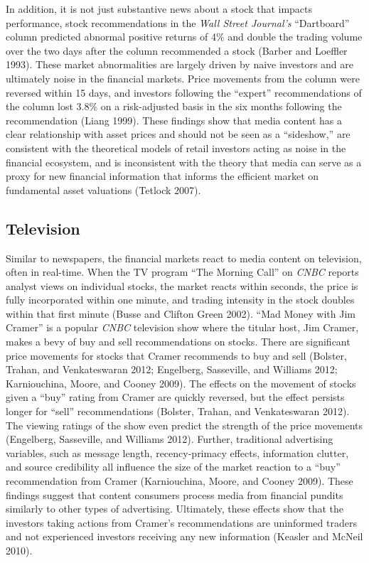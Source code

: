 \documentclass[12pt,]{article}
\begin{document}
In addition, it is not just substantive news about a stock that impacts
performance, stock recommendations in the \emph{Wall Street Journal's}
``Dartboard'' column predicted abnormal positive returns of 4\% and
double the trading volume over the two days after the column recommended
a stock (Barber and Loeffler 1993). These market abnormalities are
largely driven by naive investors and are ultimately noise in the
financial markets. Price movements from the column were reversed within
15 days, and investors following the ``expert'' recommendations of the
column lost 3.8\% on a risk-adjusted basis in the six months following
the recommendation (Liang 1999). These findings show that media content
has a clear relationship with asset prices and should not be seen as a
``sideshow,'' are consistent with the theoretical models of retail
investors acting as noise in the financial ecosystem, and is
inconsistent with the theory that media can serve as a proxy for new
financial information that informs the efficient market on fundamental
asset valuations (Tetlock 2007).

\hypertarget{television}{%
\subsection{Television}\label{television}}

Similar to newspapers, the financial markets react to media content on
television, often in real-time. When the TV program ``The Morning Call''
on \emph{CNBC} reports analyst views on individual stocks, the market
reacts within seconds, the price is fully incorporated within one
minute, and trading intensity in the stock doubles within that first
minute (Busse and Clifton Green 2002). ``Mad Money with Jim Cramer'' is
a popular \emph{CNBC} television show where the titular host, Jim
Cramer, makes a bevy of buy and sell recommendations on stocks. There
are significant price movements for stocks that Cramer recommends to buy
and sell (Bolster, Trahan, and Venkateswaran 2012; Engelberg,
Sasseville, and Williams 2012; Karniouchina, Moore, and Cooney 2009).
The effects on the movement of stocks given a ``buy'' rating from Cramer
are quickly reversed, but the effect persists longer for ``sell''
recommendations (Bolster, Trahan, and Venkateswaran 2012). The viewing
ratings of the show even predict the strength of the price movements
(Engelberg, Sasseville, and Williams 2012). Further, traditional
advertising variables, such as message length, recency-primacy effects,
information clutter, and source credibility all influence the size of
the market reaction to a ``buy'' recommendation from Cramer
(Karniouchina, Moore, and Cooney 2009). These findings suggest that
content consumers process media from financial pundits similarly to
other types of advertising. Ultimately, these effects show that the
investors taking actions from Cramer's recommendations are uninformed
traders and not experienced investors receiving any new information
(Keasler and McNeil 2010).
\end{document}
